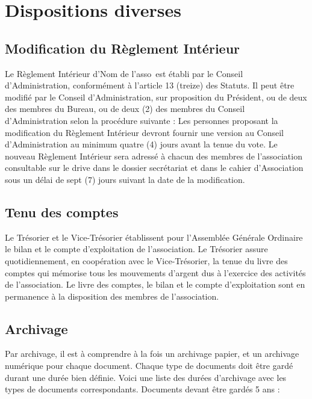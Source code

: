 \documentclass[12pt]{article}
\newcommand{\asso}{Nom de l'asso}
\begin{document}
\section{Dispositions diverses}
\label{sec:dispositions_diverses}


\subsection{Modification du Règlement Intérieur}
\label{sec:dispositions_diverses:modification}


Le Règlement Intérieur d’\asso~est établi par le Conseil d’Administration, conformément à l’article 13
(treize) des Statuts.
Il peut être modifié par le Conseil d’Administration, sur proposition du Président, ou de deux des membres du
Bureau, ou de deux (2) des membres du Conseil d’Administration selon la procédure suivante :
Les personnes proposant la modification du Règlement Intérieur devront fournir une version au Conseil
d’Administration au minimum quatre (4) jours avant la tenue du vote.
Le nouveau Règlement Intérieur sera adressé à chacun des membres de l’association consultable sur le drive
dans le dossier secrétariat et dans le cahier d’Association sous un délai de sept (7) jours suivant la date de la
modification.

\subsection{Tenu des comptes}
\label{sec:dispositions_diverses:tenu_comptes}

Le Trésorier et le Vice-Trésorier établissent pour l’Assemblée Générale Ordinaire le bilan et le compte
d’exploitation de l’association.
Le Trésorier assure quotidiennement, en coopération avec le Vice-Trésorier, la tenue du livre des comptes qui
mémorise tous les mouvements d’argent dus à l’exercice des activités de l’association.
Le livre des comptes, le bilan et le compte d’exploitation sont en permanence à la disposition des membres
de l’association.


\subsection{Archivage}
\label{sec:dispositions_diverses:archivage}


Par archivage, il est à comprendre à la fois un archivage papier, et un archivage numérique pour chaque
document. Chaque type de documents doit être gardé durant une durée bien définie. Voici une liste des
durées d’archivage avec les types de documents correspondants.
Documents devant être gardés 5 ans :
\end{document}
